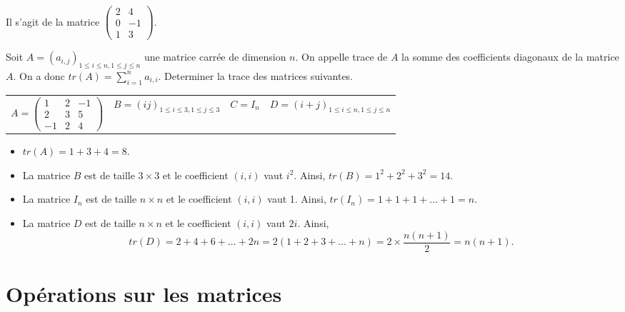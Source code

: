 \documentclass[11pt,fleqn]{book} %
\begin{document}
\begin{solution}Il s'agit de la matrice \(\begin{pmatrix}2 & 4 \\ 0 & -1 \\ 1 & 3 \end{pmatrix}\).\end{solution}

\begin{exercise}[topic=mat01]Soit $A=(a_{i,j})_{1 \leqslant i \leqslant n, 1\leqslant j \leqslant n}$ une matrice carrée de dimension $n$. On appelle trace de $A$ la somme des coefficients diagonaux de la matrice $A$. On a donc $tr(A)=\displaystyle\sum_{i=1}^n a_{i,i}$. Determiner la trace des matrices suivantes.

\begin{tabularx}{\linewidth}{XXXX}
$A=\begin{pmatrix} 1 & 2 & -1 \\ 2 & 3 & 5 \\ -1 & 2 & 4\end{pmatrix}$ & $B=( ij)_{1 \leqslant i \leqslant 3, 1\leqslant j \leqslant 3}$ & $C=I_n$ & $D= ( i+j)_{1 \leqslant i \leqslant n, 1\leqslant j \leqslant n}$\end{tabularx}
\vspace{-1cm}
\end{exercise}

\begin{solution}
\begin{itemize}
\item \(tr(A)=1+3+4=8\).
\item La matrice $B$ est de taille \(3\times 3\) et le coefficient \((i,i)\) vaut \(i^2\). Ainsi, \(tr(B)=1^2+2^2+3^2 = 14\).
\item La matrice \(I_n\) est de taille \(n\times n\) et le coefficient \((i,i)\) vaut 1. Ainsi, \(tr(I_n)=1+1+1+\dots+1=n\).
\item La matrice \(D\) est de taille \(n\times n\) et le coefficient \((i,i)\) vaut \(2i\). Ainsi, \[tr(D)=2+4+6+\dots + 2n = 2(1+2+3+\dots + n)=2 \times \dfrac{n(n+1)}{2} = n(n+1) .\]
\end{itemize}
\end{solution}



\section*{Opérations sur les matrices}
\end{document}
